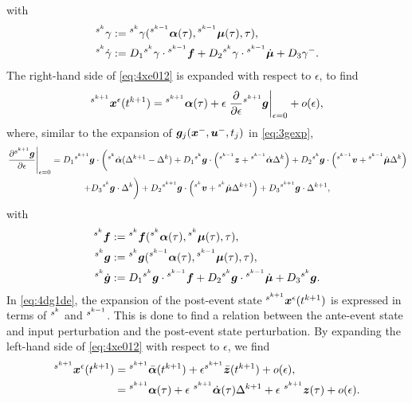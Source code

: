 \documentclass[../DC2017114Bouma.tex]{subfiles}
\begin{document}
with
\begin{align*}
\hspace{0cm}^{s^k}\gamma &:= \hspace{0cm}^{s^k}\gamma(\hspace{0cm}^{s^{k-1}}\boldsymbol{\alpha}(\tau),\hspace{0cm}^{s^{k-1}}\boldsymbol{\mu}(\tau),\tau),\\
\hspace{0cm}^{s^k}\dot{\gamma} &:= D_1\hspace{0cm}^{s^{k}}\gamma\cdot\hspace{0cm}^{s^{k-1}}{\boldsymbol{f}} + D_2\hspace{0cm}^{s^{k}}\gamma\cdot\hspace{0cm}^{s^{k-1}}\dot{\boldsymbol{\mu}} + D_3\gamma^-.
\end{align*}
The right-hand side of \eqref{eq:4xe012} is expanded with respect to $\epsilon$, to find
\begin{align}
\hspace{0cm}^{s^{k+1}}{\boldsymbol{x}}^\epsilon(t^{k+1}) = \hspace{0cm}^{s^{k+1}}\boldsymbol{\alpha}(\tau) + \epsilon\left.\frac{\partial}{\partial\epsilon}\hspace{0cm}^{s^{k+1}}{\boldsymbol{g}}\right|_{\epsilon=0} + o(\epsilon),\label{eq:4xe012exp}
\end{align}
where, similar to the expansion of ${\boldsymbol{g}}_j({\boldsymbol{x}}^-,{\boldsymbol{u}}^-,t_j)$ in \eqref{eq:3gexp},
\begin{multline}
\left.\frac{\partial\hspace{0cm}^{s^{k+1}}{\boldsymbol{g}}}{\partial\epsilon}\right|_{\epsilon=0} = D_1\hspace{0cm}^{s^{k+1}}{\boldsymbol{g}}\cdot\bigg(\hspace{0cm}^{s^k}\dot{\boldsymbol{\alpha}}(\Delta^{k+1}-\Delta^{k}) + D_1\hspace{0cm}^{s^k}{\boldsymbol{g}}\cdot\left(\hspace{0cm}^{s^{k-1}}{\boldsymbol{z}}+\hspace{0cm}^{s^{k-1}}\dot{\boldsymbol{\alpha}}\Delta^{k}\right) + D_2\hspace{0cm}^{s^k}{\boldsymbol{g}}\cdot\left(\hspace{0cm}^{s^{k-1}}{\boldsymbol{v}}+\hspace{0cm}^{s^{k-1}}\dot{\boldsymbol{\mu}}\Delta^{k}\right) \\ + D_3\hspace{0cm}^{s^k}{\boldsymbol{g}}\cdot\Delta^{k} \bigg)+ D_2 \hspace{0cm}^{s^{k+1}}{\boldsymbol{g}}\cdot\left(\hspace{0cm}^{s^{k}}{\boldsymbol{v}}+\hspace{0cm}^{s^{k}}\dot{\boldsymbol{\mu}}\Delta^{k+1} \right) + D_3\hspace{0cm}^{s^{k+1}}{\boldsymbol{g}}\cdot\Delta^{k+1},\label{eq:4dg1de}
\end{multline}
with
\begin{align*}
\hspace{0cm}^{s^k}{\boldsymbol{f}} &:= \hspace{0cm}^{s^k}{\boldsymbol{f}}(\hspace{0cm}^{s^{k}}\boldsymbol{\alpha}(\tau),\hspace{0cm}^{s^{k}}\boldsymbol{\mu}(\tau),\tau),\\
\hspace{0cm}^{s^k}{\boldsymbol{g}} &:= \hspace{0cm}^{s^k}{\boldsymbol{g}}(\hspace{0cm}^{s^{k-1}}\boldsymbol{\alpha}(\tau),\hspace{0cm}^{s^{k-1}}\boldsymbol{\mu}(\tau),\tau),\\
\hspace{0cm}^{s^k}\dot{{\boldsymbol{g}}} &:= D_1\hspace{0cm}^{s^k}{\boldsymbol{g}}\cdot \hspace{0cm}^{s^{k-1}}{\boldsymbol{f}} + D_2\hspace{0cm}^{s^k}{\boldsymbol{g}}\cdot \hspace{0cm}^{s^{k-1}}\dot{\boldsymbol{\mu}} + D_3\hspace{0cm}^{s^k}{\boldsymbol{g}}.
\end{align*}
In \eqref{eq:4dg1de}, the expansion of the post-event state $\hspace{0cm}^{s^{k+1}}{\boldsymbol{x}}^\epsilon(t^{k+1})$ is expressed in terms of $\hspace{0cm}^{s^{k}}$ and $\hspace{0cm}^{s^{k-1}}$. This is done to find a relation between the ante-event state and input perturbation and the post-event state perturbation. By expanding the left-hand side of \eqref{eq:4xe012} with respect to $\epsilon$, we find
\begin{align}
\ls^{s^{k+1}}\xb^\epsilon(t^{k+1}) &= \ls^{s^{k+1}}\bar{\alphab}(t^{k+1})+\epsilon\ls^{s^{k+1}}\bar{\zb}(t^{k+1}) + o(\epsilon),\\
&= \ls^{s^{k+1}}\alphab(\tau) + \epsilon\ ^{s^{k+1}}\dot{\alphab}(\tau)\Delta^{k+1} + \epsilon\ ^{s^{k+1}}\zb(\tau) + o(\epsilon).\label{eq:4xexp}
\end{align}
\end{document}
